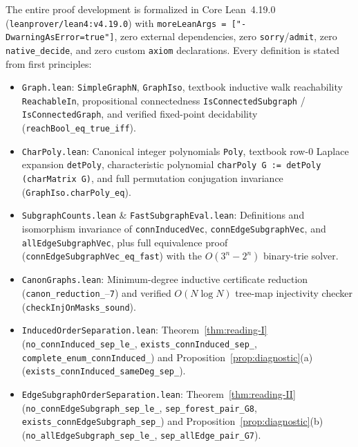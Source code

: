 \documentclass[11pt]{article}
\theoremstyle{definition}
\begin{document}
The entire proof development is formalized in Core Lean~4.19.0 (\texttt{leanprover/lean4:v4.19.0}) with \texttt{moreLeanArgs = ["-DwarningAsError=true"]}, zero external dependencies, zero \texttt{sorry}/\texttt{admit}, zero \texttt{native\_decide}, and zero custom \texttt{axiom} declarations. Every definition is stated from first principles:
\begin{itemize}\raggedright
  \item \texttt{Graph.lean}: \texttt{SimpleGraphN}, \texttt{GraphIso}, textbook inductive walk reachability \texttt{ReachableIn}, propositional connectedness \texttt{IsConnectedSubgraph} / \texttt{IsConnectedGraph}, and verified fixed-point decidability (\texttt{reachBool\_\allowbreak eq\_\allowbreak true\_\allowbreak iff}).
  \item \texttt{CharPoly.lean}: Canonical integer polynomials \texttt{Poly}, textbook row-$0$ Laplace expansion \texttt{detPoly}, characteristic polynomial \texttt{charPoly G := detPoly (charMatrix G)}, and full permutation conjugation invariance (\texttt{GraphIso.\allowbreak charPoly\_\allowbreak eq}).
  \item \texttt{SubgraphCounts.lean} \& \texttt{FastSubgraphEval.lean}: Definitions and isomorphism invariance of \texttt{connInducedVec}, \texttt{connEdgeSubgraphVec}, and \texttt{allEdgeSubgraphVec}, plus full equivalence proof (\texttt{connEdgeSubgraphVec\_\allowbreak eq\_\allowbreak fast}) with the $O(3^n - 2^n)$ binary-trie solver.
  \item \texttt{CanonGraphs.lean}: Minimum-degree inductive certificate reduction (\texttt{canon\_\allowbreak reduction\_}--\texttt{7}) and verified $O(N \log N)$ tree-map injectivity checker (\texttt{checkInjOnMasks\_\allowbreak sound}).
  \item \texttt{InducedOrderSeparation.lean}: Theorem~\ref{thm:reading-I} (\texttt{no\_\allowbreak connInduced\_\allowbreak sep\_\allowbreak le\_}, \texttt{exists\_\allowbreak connInduced\_\allowbreak sep\_}, \texttt{complete\_\allowbreak enum\_\allowbreak connInduced\_}) and Proposition~\ref{prop:diagnostic}(a) (\texttt{exists\_\allowbreak connInduced\_\allowbreak sameDeg\_\allowbreak sep\_}).
  \item \texttt{EdgeSubgraphOrderSeparation.lean}: Theorem~\ref{thm:reading-II} (\texttt{no\_\allowbreak connEdgeSubgraph\_\allowbreak sep\_\allowbreak le\_}, \texttt{sep\_\allowbreak forest\_\allowbreak pair\_\allowbreak G8}, \texttt{exists\_\allowbreak connEdgeSubgraph\_\allowbreak sep\_}) and Proposition~\ref{prop:diagnostic}(b) (\texttt{no\_\allowbreak allEdgeSubgraph\_\allowbreak sep\_\allowbreak le\_}, \texttt{sep\_\allowbreak allEdge\_\allowbreak pair\_\allowbreak G7}).

\end{itemize}
\end{document}
